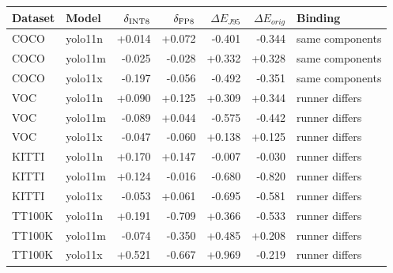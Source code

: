 \begin{tabular}{llrrrrl}
\toprule
Dataset & Model & $\delta_{\rm INT8}$ & $\delta_{\rm FP8}$ & $\Delta E_{J95}$ & $\Delta E_{orig}$ & Binding\\
\midrule
COCO & yolo11n & +0.014 & +0.072 & -0.401 & -0.344 & same components\\
COCO & yolo11m & -0.025 & -0.028 & +0.332 & +0.328 & same components\\
COCO & yolo11x & -0.197 & -0.056 & -0.492 & -0.351 & same components\\
VOC & yolo11n & +0.090 & +0.125 & +0.309 & +0.344 & runner differs\\
VOC & yolo11m & -0.089 & +0.044 & -0.575 & -0.442 & runner differs\\
VOC & yolo11x & -0.047 & -0.060 & +0.138 & +0.125 & runner differs\\
KITTI & yolo11n & +0.170 & +0.147 & -0.007 & -0.030 & runner differs\\
KITTI & yolo11m & +0.124 & -0.016 & -0.680 & -0.820 & runner differs\\
KITTI & yolo11x & -0.053 & +0.061 & -0.695 & -0.581 & runner differs\\
TT100K & yolo11n & +0.191 & -0.709 & +0.366 & -0.533 & runner differs\\
TT100K & yolo11m & -0.074 & -0.350 & +0.485 & +0.208 & runner differs\\
TT100K & yolo11x & +0.521 & -0.667 & +0.969 & -0.219 & runner differs\\
\bottomrule
\end{tabular}
